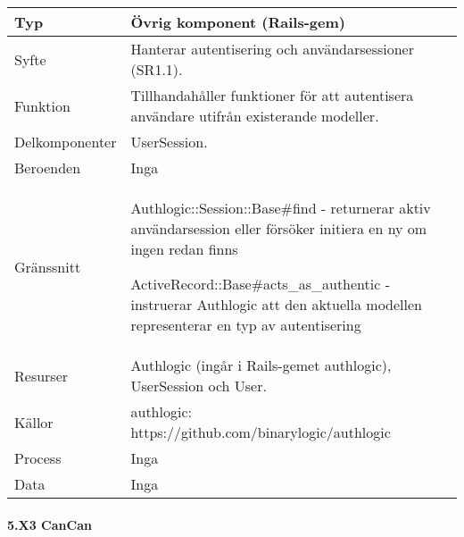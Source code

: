 \documentclass[a4paper, twoside, 11pt, titlepage]{article}
\begin{document}
			\begin {table} [ht] \begin{tabular} {  p{3.5cm} p{9.6cm} }
				\hline
				{Typ} & {Övrig komponent (Rails-gem)} \\
				\hline
				{Syfte} & {Hanterar autentisering och användarsessioner (SR1.1).} \\
				\hline
				{Funktion} & {Tillhandahåller funktioner för att autentisera användare utifrån existerande modeller.} \\
				\hline
				{Delkomponenter} & {UserSession.} \\
				\hline
				{Beroenden} & {Inga} \\
				\hline
				{Gränssnitt} & {Authlogic::Session::Base\#find - returnerar aktiv användarsession eller försöker initiera en ny om ingen redan finns

ActiveRecord::Base\#acts\_as\_authentic - instruerar Authlogic att den aktuella modellen representerar en typ av autentisering} \\
				\hline
				{Resurser} & {Authlogic (ingår i Rails-gemet authlogic), UserSession och User.} \\
				\hline
				{Källor} & {authlogic: https://github.com/binarylogic/authlogic} \\
				\hline
				{Process} & {Inga} \\
				\hline
				{Data} & {Inga} \\
				\hline
			\end{tabular} \end{table} \FloatBarrier


			\paragraph{5.X3 CanCan}\
\end{document}
